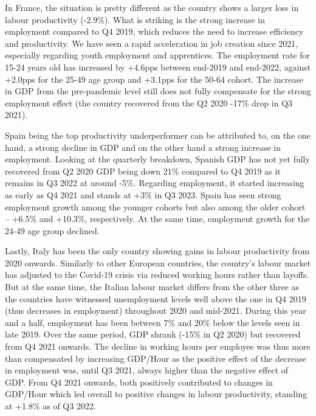 In France, the situation is pretty different as the country shows a larger loss in labour productivity (-2.9\%). 
What is striking is the strong increase in employment compared to Q4 2019, which reduces the need to increase efficiency and productivity. 
We have seen a rapid acceleration in job creation since 2021, especially regarding youth employment and apprentices. 
The employment rate for 15-24 years old has increased by +4.6pps between end-2019 and end-2022, against +2.0pps for the 25-49 age group and +3.1pps for the 50-64 cohort. 
The increase in GDP from the pre-pandemic level still does not fully compensate for the strong employment effect (the country recovered from the Q2 2020 -17\% drop in Q3 2021).

Spain being the top productivity underperformer can be attributed to, on the one hand, a strong decline in GDP and on the other hand a strong increase in employment. 
Looking at the quarterly breakdown, Spanish GDP has not yet fully recovered from Q2 2020 GDP being down 21\% compared to Q4 2019 as it remains in Q3 2022 at around -5\%. 
Regarding employment, it started increasing as early as Q4 2021 and stands at +3\% in Q3 2023. 
Spain has seen strong employment growth among the younger cohorts but also among the older cohort – +6.5\% and +10.3\%, respectively. 
At the same time, employment growth for the 24-49 age group declined.

Lastly, Italy has been the only country showing gains in labour productivity from 2020 onwards. 
Similarly to other European countries, the country’s labour market has adjusted to the Covid-19 crisis via reduced working hours rather than layoffs. 
But at the same time, the Italian labour market differs from the other three as the countries have witnessed unemployment levels well above the one in Q4 2019 (thus decreases in employment) throughout 2020 and mid-2021. 
During this year and a half, employment has been between 7\% and 20\% below the levels seen in late 2019. 
Over the same period, GDP shrank (-15\% in Q2 2020) but recovered from Q4 2021 onwards. 
The decline in working hours per employee was thus more than compensated by increasing GDP/Hour as the positive effect of the decrease in employment was, until Q3 2021, always higher than the negative effect of GDP. 
From Q4 2021 onwards, both positively contributed to changes in GDP/Hour which led overall to positive changes in labour productivity, standing at +1.8\% as of Q3 2022. 

